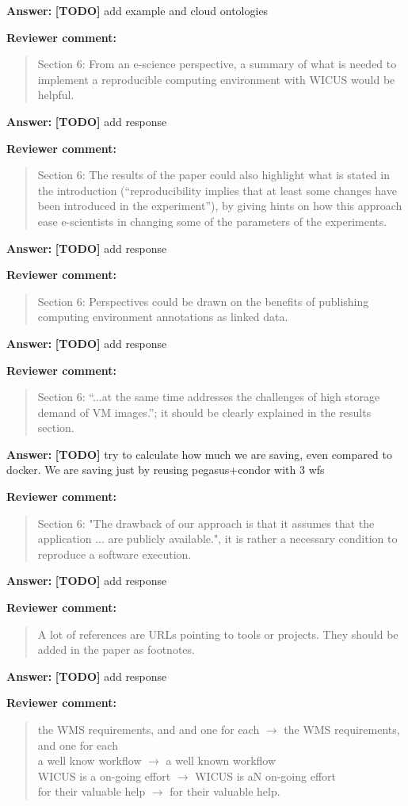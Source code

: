 \documentclass{letter}
\newenvironment{review}%
{\textbf{Reviewer comment:}\begin{quote}}%
{\end{quote}}%
\newcommand{\todo}[1]{%
      \color{red}\textbf{[TODO]} #1\color{black}}
\newcommand{\answer}[1]{%
      \textbf{Answer:} #1}
\begin{document}
\begin{letter}{}
\answer{\todo{add example and cloud ontologies}}


\begin{review}
Section 6: From an e-science perspective, a summary of what is needed to implement a reproducible computing environment with WICUS would be helpful.
\end{review}

\answer{\todo{add response}}


\begin{review}
Section 6: The results of the paper could also highlight what is stated in the introduction (``reproducibility implies that at least some changes have been introduced in the experiment''), by giving hints on how this approach ease e-scientists in changing some of the parameters of the experiments.
\end{review}

\answer{\todo{add response}}


\begin{review}
Section 6: Perspectives could be drawn on the benefits of publishing computing environment annotations as linked data.
\end{review}

\answer{\todo{add response}}


\begin{review}
Section 6: ``...at the same time addresses the challenges of high storage demand of VM images.''; it should be clearly explained in the results section.
\end{review}

\answer{\todo{try to calculate how much we are saving, even compared to docker. We are saving just by reusing pegasus+condor with 3 wfs}}


\begin{review}
Section 6: "The drawback of our approach is that it assumes that the application ...  are publicly available.", it is rather a necessary condition to reproduce a software execution.
\end{review}

\answer{\todo{add response}}


\begin{review}
A lot of references are URLs pointing to tools or projects. They should be added in the paper as footnotes.
\end{review}

\answer{\todo{add response}}


\begin{review}
the WMS requirements, and and one for each $\rightarrow$ the WMS requirements, and one for each \\
a well know workflow $\rightarrow$ a well known workflow \\
WICUS is a on-going effort $\rightarrow$ WICUS is aN on-going effort \\
for their valuable help $\rightarrow$ for their valuable help.
\end{review}


\end{letter}
\end{document}
